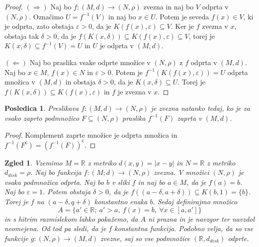 \documentclass[10pt, a4paper]{article}
\newtheorem{posledica}[izr]{Posledica}
\newtheorem{zgled}{Zgled}[section]
\newenvironment{noticeC}{%
  \tcolorbox[%
  notitle,
  empty,
  enhanced,  %
  breakable,
  coltext=black, 
  fontupper=\rmfamily,
  parbox=false,
  noparskip,
  sharp corners,
  boxrule=-1pt,  %
  frame hidden,
  left=7pt,  %
  right=7pt,
  top=5pt,
  bottom=5pt,
  before skip=2.5ex plus 2pt,
  after skip=2.5ex plus 2pt,
  overlay unbroken and last={%
  },
  ]}
{\endtcolorbox}
\newenvironment{dokaz}%
  {\begin{noticeC}\begin{proof}}%
  {\end{proof}\end{noticeC}}
\newcommand{\R}{\mathbb {R}}
\begin{document}
\begin{dokaz}
    $(\Rightarrow)$ Naj bo $f: (M, d) \rightarrow (N, \rho)$ zvezna in naj bo $V$ odprta v $(N, \rho)$.
    Označimo $U = f^{-1} (V)$ in naj bo $x \in U$.
    Potem je seveda $f(x) \in V$, ki je odprta, zato obstaja $\varepsilon > 0$, da je $K(f(x), \varepsilon) \subseteq V$.
    Ker je $f$ zvezna v $x$, obstaja tak $\delta > 0$, da je $f(K(x,\delta)) \subseteq K(f(x), \varepsilon) \subseteq V$,
    torej je $K(x, \delta) \subseteq f^{-1} (V) = U$ in $U$ je odprta v $(M, d)$.

    $(\Leftarrow)$ Naj bo praslika vsake odprte množice v $(N, \rho)$ z $f$ odprta v $(M, d)$.
    Naj bo $x \in M$, $f(x) \in N$ in $\varepsilon > 0$. Potem je $f^{-1} (K(f(x), \varepsilon)) = U$
    odprta množica v $(M, d)$ in obstaja $\delta > 0$, da je $K(x, \delta) \subseteq U$.
    Torej je $f(K(x, \delta)) \subseteq K(f(x), \varepsilon)$ in $f$ je zvezna v $x$.
\end{dokaz}

\begin{posledica}
    Preslikava $f: (M, d) \rightarrow (N, \rho)$ je zvezna natanko tedaj, ko je za vsako zaprto podmnožico $F \subseteq (N, \rho)$
    praslika $f^{-1} (F)$ zaprta v $(M, d)$.
\end{posledica}

\begin{dokaz}
    Komplement zaprte množice je odprta množica in $f^{-1} (F^\mathsf{c}) = \left(f^{-1} (F)\right)^\mathsf{c}$.
\end{dokaz}

\begin{zgled}
    Vzemimo $M = \R$ z metriko $d(x,y) = |x-y|$ in $N = \R$ z metriko $d_{disk} = \rho$.
    Naj bo funkcija $f:(M; d) \rightarrow (N, \rho)$ zvezna.
    V množici $(N, \rho)$ je vsaka podmnožica odprta.
    Naj bo $b$ v sliki $f$ in naj bo $a \in M$, da je $f(a) = b$.
    Naj bo $\varepsilon = 1$.
    Potem obstaja $\delta > 0$, da je $f((a-\delta, a+ \delta)) \subseteq K(b, 1) = \{b\}$.
    Torej je $f$ na $(a- \delta, q + \delta)$ konstantno enaka $b$.
    Sedaj definirajmo množico 
    $$A = \{a' \in \R;\ a' > a,\ f(x) = b,\ \forall x \in [a, a']\}$$
    in s hitrim razmislekom lahko pokažemo, da $A$ ni prazna in je navzgor ter navzdol neomejena.
    Od tod pa sledi, da je $f$ konstantna funkcija.
    Podobno velja, da so vse funkcije $g: (N, \rho) \rightarrow (M, d)$ zvezne,
    saj so vse podmnožice $(\R, d_{disk})$ odprte. 
\end{zgled}
\end{document}
